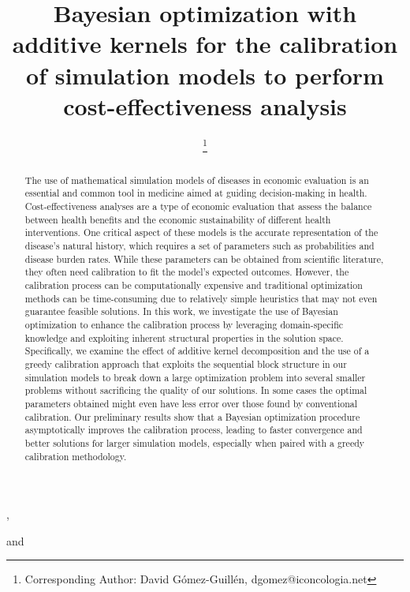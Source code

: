 \documentclass{IOS-Book-Article}
\def\hb{\hbox to 11.5 cm{}}
\begin{document}
	
	\pagestyle{headings}
	\def\thepage{}
	\begin{frontmatter}              %
		
		
		\title{Bayesian optimization with additive kernels for the calibration of simulation models to perform cost-effectiveness analysis}
		
		\markboth{}{April 2023\hb}
		
		\author[A,B]{ %
			\thanks{Corresponding Author: David Gómez-Guillén, dgomez@iconcologia.net}},
		\author[B,C]{ }
		\author[D]{ }
		and
		\author[D]{ }
		
		\address[A]{Universitat Autònoma de Barcelona (UAB)}
		\address[B]{Institut Català d'Oncologia (ICO) - Institut d'Investigació Biomèdica de Bellvitge (IDIBELL)}
		\address[C]{Consortium for Biomedical Research in Epidemiology and Public Health - CIBERESP. Carlos III Institute of Health}
		\address[D]{Institut d'Investigació en Intel·ligència Artificial - Consell Superior d'Investigacions Científiques (IIIA-CSIC)}
		
		\begin{abstract}
			The use of mathematical simulation models of diseases in economic evaluation is an essential and common tool in medicine aimed at guiding decision-making in health. Cost-effectiveness analyses are a type of economic evaluation that assess the balance between health benefits and the economic sustainability of different health interventions. One critical aspect of these models is the accurate representation of the disease's natural history, which requires a set of parameters such as probabilities and disease burden rates. While these parameters can be obtained from scientific literature, they often need calibration to fit the model's expected outcomes. However, the calibration process can be computationally expensive and traditional optimization methods can be time-consuming due to relatively simple heuristics that may not even guarantee feasible solutions.
			In this work, we investigate the use of Bayesian optimization to enhance the calibration process by leveraging domain-specific knowledge and exploiting inherent structural properties in the solution space. Specifically, we examine the effect of additive kernel decomposition and the use of a greedy calibration approach that exploits the sequential block structure in our simulation models to break down a large optimization problem into several smaller problems without sacrificing the quality of our solutions. In some cases the optimal parameters obtained might even have less error over those found by conventional calibration.
			Our preliminary results show that a Bayesian optimization procedure asymptotically improves the calibration process, leading to faster convergence and better solutions for larger simulation models, especially when paired with a greedy calibration methodology.
		\end{abstract}
		

\end{frontmatter}
\end{document}

